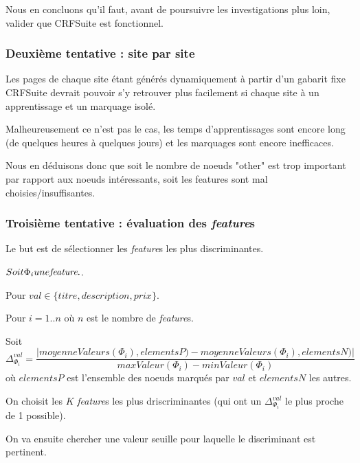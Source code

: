 \documentclass{article}
\begin{document}
Nous en concluons qu'il faut, avant de poursuivre les investigations plus loin,
valider que CRFSuite est fonctionnel.

\subsubsection{Deuxième tentative : site par site}
Les pages de chaque site étant générés dynamiquement à partir d'un gabarit fixe
CRFSuite devrait pouvoir s'y retrouver plus facilement si chaque site à un apprentissage
et un marquage isolé.

Malheureusement ce n'est pas le cas, les temps d'apprentissages sont encore long (de
quelques heures à quelques jours) et les marquages sont encore inefficaces.

Nous en déduisons donc que soit le nombre de noeuds "other" est trop important par
rapport aux noeuds intéressants, soit les features sont mal choisies/insuffisantes.

\subsubsection{Troisième tentative : évaluation des \emph{feature}s}
Le but est de sélectionner les \emph{feature}s les plus discriminantes.

$Soit \Phi_i une \emph{feature}.$.

Pour $val \in \{titre, description, prix\}$.

Pour $i = 1..n$ où $n$ est le nombre de \emph{feature}s.

Soit \[  \Delta^{val}_{\Phi_i}= \frac{|moyenneValeurs(\Phi_i), elementsP) - moyenneValeurs(\Phi_i), elementsN)|}{maxValeur(\Phi_i) - minValeur(\Phi_i)}\]
où $elementsP$ est l'ensemble des noeuds marqués par $val$ et $elementsN$ les autres.

On choisit les $K$ \emph{feature}s les plus driscriminantes (qui ont un $\Delta^{val}_{\Phi_i}$ le plus proche de 1 possible).

On va ensuite chercher une valeur seuille pour laquelle le discriminant est pertinent.
\end{document}
